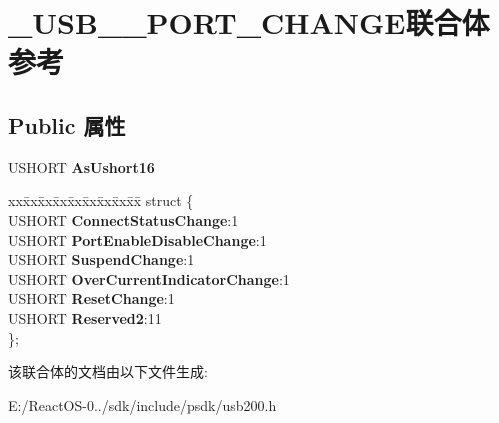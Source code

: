 \hypertarget{union___u_s_b__20___p_o_r_t___c_h_a_n_g_e}{}\section{\+\_\+\+U\+S\+B\+\_\+\_\+\+P\+O\+R\+T\+\_\+\+C\+H\+A\+N\+G\+E联合体 参考}
\label{union___u_s_b__20___p_o_r_t___c_h_a_n_g_e}
\subsection*{Public 属性}
\begin{DoxyCompactItemize}
\item 
\mbox{\label{union___u_s_b__20___p_o_r_t___c_h_a_n_g_e_a127f397acf0bcfcfc141b09d8fb99ea2}} 
U\+S\+H\+O\+RT {\bfseries As\+Ushort16}
\item 
\mbox{\label{union___u_s_b__20___p_o_r_t___c_h_a_n_g_e_ae4537af22bf1cdd60ed0afd661aa49c0}} 
\begin{tabbing}
xx\=xx\=xx\=xx\=xx\=xx\=xx\=xx\=xx\=\kill
struct \{\\
\>USHORT {\bfseries ConnectStatusChange}:1\\
\>USHORT {\bfseries PortEnableDisableChange}:1\\
\>USHORT {\bfseries SuspendChange}:1\\
\>USHORT {\bfseries OverCurrentIndicatorChange}:1\\
\>USHORT {\bfseries ResetChange}:1\\
\>USHORT {\bfseries Reserved2}:11\\
\}; \\

\end{tabbing}\end{DoxyCompactItemize}


该联合体的文档由以下文件生成\+:\begin{DoxyCompactItemize}
\item 
E\+:/\+React\+O\+S-\/0../sdk/include/psdk/usb200.\+h\end{DoxyCompactItemize}
